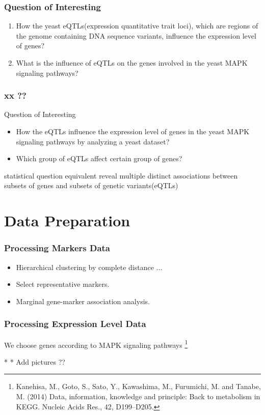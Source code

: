 \begin{frame}\frametitle{Question of Interesting}
    \begin{enumerate}
        \item How the yeast eQTLs(expression quantitative trait loci), which are regions of the genome containing DNA sequence variants, influence the expression level of genes? 
        \item What is the influence of eQTLs on the genes involved in the yeast MAPK signaling pathways?
    \end{enumerate}
\end{frame}

\begin{frame}\frametitle{ xx ??}
    \begin{block}{Question of Interesting}
        \begin{itemize}
        \item How the eQTLs influence the expression level of genes in the yeast MAPK signaling pathways by analyzing a yeast dataset?
        \item Which group of eQTLs affect certain group of genes?
        \end{itemize}
    \end{block}
    
    \begin{block}{statistical question equivalent}
        reveal multiple distinct associations between subsets of genes and subsets of genetic variants(eQTLs)
    \end{block}
\end{frame}


\section{Data Preparation}
\begin{frame}
    \sectionpage
\end{frame}

\begin{frame}
    \frametitle{Processing Markers Data}

    \begin{itemize}
        \item Hierarchical clustering by complete distance ...
        \item Select representative markers.
        \item Marginal gene-marker association analysis.
    \end{itemize}
\end{frame}

\begin{frame}
    \frametitle{Processing Expression Level Data}

    We choose genes according to MAPK signaling pathways \footnote[2]{Kanehisa, M., Goto, S., Sato, Y., Kawashima, M., Furumichi, M. and Tanabe, M. (2014) Data, information, knowledge and principle: Back to metabolism in KEGG. Nucleic Acids Res., 42, D199–D205.}

    * * Add pictures ?? 
\end{frame}